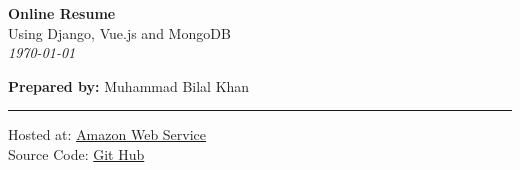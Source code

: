 \documentclass[11pt]{article}
\begin{document}

\begin{flushright}
	\Huge{\textbf{Online Resume}} \\
	\Large{Using Django, Vue.js and MongoDB} \\
	\emph{\large{\today}} \\
\end{flushright}

\begin{flushleft}
	\large{\textbf{Prepared by: } Muhammad Bilal Khan} \\
\end{flushleft}

\vspace{-0.8cm}

\begin{center}
	{\rule{475pt}{1pt}}
\end{center}
	
\begin{flushright}
	Hosted at: \href{http://ec2-52-23-221-163.compute-1.amazonaws.com:5000/}{Amazon Web Service} \\
	Source Code: \href{'https://github.com/Bill-Klay/Online-Resume}{Git Hub} \\
\end{flushright}
\end{document}

